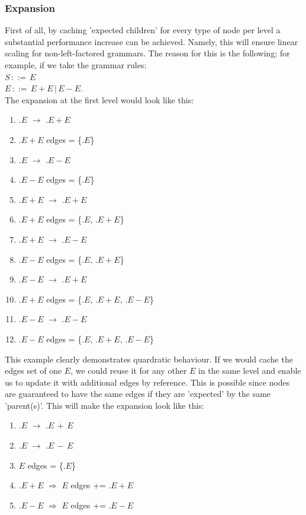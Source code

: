 \documentclass[a4paper,10pt]{article}
\begin{document}
\subsubsection{Expansion}
First of all, by caching 'expected children' for every type of node per level a substantial performance increase can be achieved. Namely, this will ensure linear scaling for non-left-factored grammars. The reason for this is the following; for example, if we take the grammar rules:\\
$S\,::=\,E$\\
$E\,::=\,E + E\,|\,E - E$.\\
The expansion at the first level would look like this:
\begin{enumerate}
 \setlength{\itemsep}{0pt}
 \setlength{\parskip}{0pt}
 \setlength{\parsep}{0pt}
 
 \item $.E$ $\rightarrow$ $.E+E$
 \item $.E+E$ edges = \{$.E$\}
 \item $.E$ $\rightarrow$ $.E-E$
 \item $.E-E$ edges = \{$.E$\}
 \item $.E+E$ $\rightarrow$ $.E+E$
 \item $.E+E$ edges = \{$.E$, $.E+E$\}
 \item $.E+E$ $\rightarrow$ $.E-E$
 \item $.E-E$ edges = \{$.E$, $.E+E$\}
 \item $.E-E$ $\rightarrow$ $.E+E$
 \item $.E+E$ edges = \{$.E$, $.E+E$, $.E-E$\}
 \item $.E-E$ $\rightarrow$ $.E-E$
 \item $.E-E$ edges = \{$.E$, $.E+E$, $.E-E$\}
\end{enumerate}
This example clearly demonstrates quardratic behaviour. If we would cache the edges set of one $E$, we could reuse it for any other $E$ in the same level and enable us to update it with additional edges by reference. This is possible since nodes are guaranteed to have the same edges if they are 'expected' by the same 'parent(s)'. This will make the expansion look like this:
\begin{enumerate}
 \setlength{\itemsep}{0pt}
 \setlength{\parskip}{0pt}
 \setlength{\parsep}{0pt}
 
 \item $.E$ $\rightarrow$ $.E\,+\,E$
 \item $.E$ $\rightarrow$ $.E\,-\,E$
 \item $E$ edges = \{$.E$\}
 \item $.E+E$ $\Rightarrow$ $E$ edges += $.E+E$
 \item $.E-E$ $\Rightarrow$ $E$ edges += $.E-E$
\end{enumerate}
\end{document}
